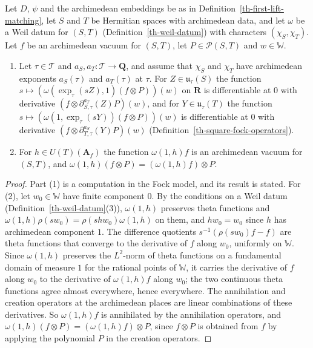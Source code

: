 \begin{lemma}\label{th-square-fock-derivatives}
Let $D$, $\psi$ and the archimedean embeddings be as in
Definition~\ref{th-first-lift-matching}, let $S$ and $T$ be Hermitian spaces
with archimedean data, and let $\omega$ be a Weil datum for $(S,T)$
(Definition~\ref{th-weil-datum}) with characters $(\chi_S,\chi_T)$. Let $f$ be
an archimedean vacuum for $(S,T)$, let $P\in\mathcal P(S,T)$ and
$w\in\mathbb W$.
\begin{enumerate}
\item Let $\tau\in\mathcal T$ and $a_S,a_T\colon\mathcal T\to\mathbf Q$, and
  assume that $\chi_S$ and $\chi_T$ have archimedean exponents $a_S(\tau)$ and
  $a_T(\tau)$ at $\tau$. For $Z\in\mathfrak u_\tau(S)$ the function
  $s\mapsto(\omega(\exp_\tau(sZ),1)(f\otimes P))(w)$ on $\mathbf R$ is
  differentiable at $0$ with derivative
  $(f\otimes\partial^{a_T}_{S,\tau}(Z)P)(w)$, and for $Y\in\mathfrak u_\tau(T)$
  the function $s\mapsto(\omega(1,\exp_\tau(sY))(f\otimes P))(w)$ is
  differentiable at $0$ with derivative
  $(f\otimes\partial^{a_S}_{T,\tau}(Y)P)(w)$
  (Definition~\ref{th-square-fock-operators}).
\item For $h\in U(T)(\mathbf A_f)$ the function $\omega(1,h)f$ is an
  archimedean vacuum for $(S,T)$, and
  $\omega(1,h)(f\otimes P)=(\omega(1,h)f)\otimes P$.
\end{enumerate}
\end{lemma}
\begin{proof}
Part (1) is a computation in the Fock model, and its result is stated. For
(2), let $w_0\in\mathbb W$ have finite component $0$. By the conditions on a
Weil datum (Definition~\ref{th-weil-datum}(3)), $\omega(1,h)$ preserves theta
functions and $\omega(1,h)\rho(sw_0)=\rho(shw_0)\omega(1,h)$ on them, and
$hw_0=w_0$ since $h$ has archimedean component $1$. The difference quotients
$s^{-1}(\rho(sw_0)f-f)$ are theta functions that converge to the derivative of
$f$ along $w_0$, uniformly on $\mathbb W$. Since $\omega(1,h)$ preserves the
$L^2$-norm of theta functions on a fundamental domain of measure $1$ for the
rational points of $\mathbb W$, it carries the derivative of $f$ along $w_0$
to the derivative of $\omega(1,h)f$ along $w_0$; the two continuous theta
functions agree almost everywhere, hence everywhere. The annihilation and
creation operators at the archimedean places are linear combinations of these
derivatives. So $\omega(1,h)f$ is annihilated by the annihilation operators,
and $\omega(1,h)(f\otimes P)=(\omega(1,h)f)\otimes P$, since $f\otimes P$ is
obtained from $f$ by applying the polynomial $P$ in the creation operators.
\end{proof}

